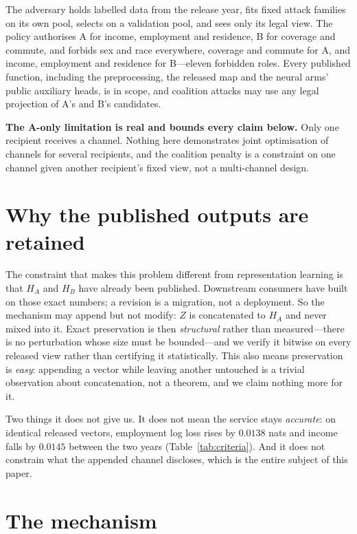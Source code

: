 \documentclass[10pt]{article}
\begin{document}
The adversary holds labelled data from the release year, fits fixed attack families on its own
pool, selects on a validation pool, and sees only its legal view. The policy authorises A for
income, employment and residence, B for coverage and commute, and forbids sex and race everywhere,
coverage and commute for A, and income, employment and residence for B---eleven forbidden roles.
Every published function, including the preprocessing, the released map and the neural arms' public
auxiliary heads, is in scope, and coalition attacks may use any legal projection of A's and B's
candidates.

\textbf{The A-only limitation is real and bounds every claim below.} Only one recipient receives a
channel. Nothing here demonstrates joint optimisation of channels for several recipients, and the
coalition penalty is a constraint on one channel given another recipient's fixed view, not a
multi-channel design.

\section{Why the published outputs are retained}
\label{sec:retained}

The constraint that makes this problem different from representation learning is that $H_A$ and
$H_B$ have already been published. Downstream consumers have built on those exact numbers; a
revision is a migration, not a deployment. So the mechanism may append but not modify: $Z$ is
concatenated to $H_A$ and never mixed into it. Exact preservation is then \emph{structural} rather
than measured---there is no perturbation whose size must be bounded---and we verify it bitwise on
every released view rather than certifying it statistically. This also means preservation is
\emph{easy}: appending a vector while leaving another untouched is a trivial observation about
concatenation, not a theorem, and we claim nothing more for it.

Two things it does not give us. It does not mean the service stays \emph{accurate}: on identical
released vectors, employment log loss rises by $0.0138$ nats and income falls by $0.0145$ between
the two years (Table~\ref{tab:criteria}). And it does not constrain what the appended channel
discloses, which is the entire subject of this paper.

\section{The mechanism}
\label{sec:method}
\end{document}
